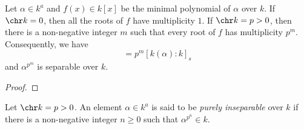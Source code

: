 \begin{proposition}
    Let $\alpha\in k^a$ and $f(x)\in k[x]$ be the minimal polynomial of $\alpha$ over $k$. If $\chr k = 0$, then all the roots of $f$ have multiplicity $1$. If $\chr k = p > 0$, then there is a non-negative integer $m$ such that every root of $f$ has multiplicity $p^m$. Consequently, we have 
    \begin{equation*}
        [k(\alpha):k] = p^m[k(\alpha):k]_s
    \end{equation*}
    and $\alpha^{p^m}$ is separable over $k$.
\end{proposition}
\begin{proof}
    
\end{proof}

\begin{definition}
    Let $\chr k = p > 0$. An element $\alpha\in k^a$ is said to be \emph{purely inseparable} over $k$ if there is a non-negative integer $n\ge 0$ such that $\alpha^{p^n}\in k$.
\end{definition}

